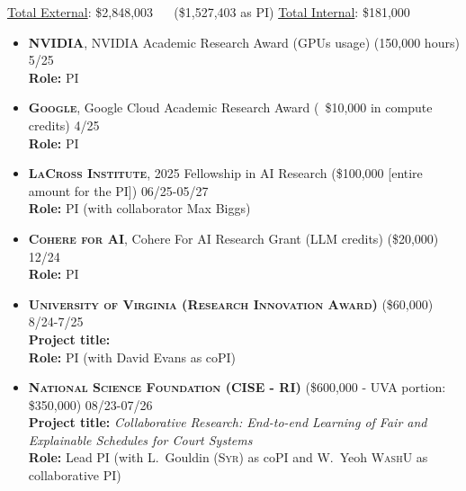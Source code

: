 \smallskip
\begin{keywords}
{\underline{Total External}: \$2,848,003 ~~ (\$1,527,403 as PI) 
\hspace{8pt} \underline{Total Internal}: \$181,000}%
\end{keywords}

\begin{itemize}
	\item \textbf{\textsc{NVIDIA}}, 
	NVIDIA Academic Research Award (GPUs usage) (150,000 hours) \hfill \textsc{5/25}\\
	{\bf Role:} PI

	\item \textbf{\textsc{Google}}, 
	Google Cloud Academic Research Award (~\$10,000 in compute credits) \hfill \textsc{4/25}\\
	{\bf Role:} PI

	\item \textbf{\textsc{LaCross Institute}}, 
	2025 Fellowship in AI Research 
	(\$100,000 [entire amount for the PI]) \hfill \textsc{06/25-05/27}\\
	{\bf Role:} PI (with collaborator Max Biggs)

	\item \textbf{\textsc{Cohere for AI}}, 
	Cohere For AI Research Grant (LLM credits) (\$20,000) \hfill \textsc{12/24}\\
	{\bf Role:} PI

	\item \textbf{\textsc{University of Virginia (Research Innovation Award)}}
	(\$60,000)
	\hfill \textsc{8/24-7/25}\\
	{\bf Project title:} \\
	{\bf Role:} PI (with David Evans as coPI)

	\item 
	\textbf{\textsc{National Science Foundation (CISE - RI)}}
	(\$600,000 - UVA portion: \$350,000)
	\hfill \textsc{08/23-07/26}\\
	{\bf Project title:} 
	{\em Collaborative Research: End-to-end Learning of Fair and Explainable Schedules for Court Systems}\\
	{\bf Role:} Lead PI (with L.~Gouldin (\textsc{Syr}) as coPI and W.~Yeoh \textsc{WashU} as collaborative PI)


\end{itemize}
